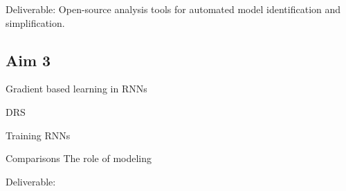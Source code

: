 \documentclass[12pt,letterpaper, onecolumn]{article}
\theoremstyle{definition}
\theoremstyle{remark}
\begin{document}
Deliverable: Open-source analysis tools for automated model identification and simplification.









\subsection*{Aim 3}



Gradient based learning in RNNs \citep{farrell2022}

DRS \citep{schmidt2019}

Training RNNs
\citep{schuessler2020}

Comparisons
The role of modeling \citep{levenstein2023}
 \citep{ostrow2024beyond}


Deliverable:  

\newpage
\printbibliography
\end{document}
